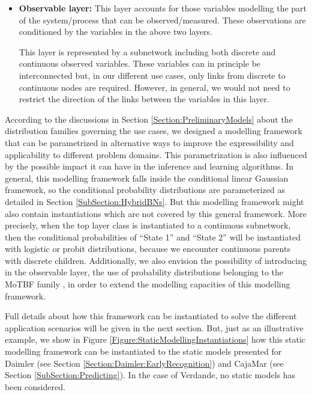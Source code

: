 \begin{itemize}
\item \textbf{Observable layer:} This layer accounts for those variables modelling the part of the system/process that can be observed/measured. These observations are conditioned by the variables in the above two layers. 

This layer is represented by a subnetwork including both discrete and continuous observed variables. These variables can in principle be interconnected but, in our different use cases, only links from discrete to continuous nodes are required. However, in general, we would not need to restrict the direction of the links between the variables in this layer.

\end{itemize} 


According to the discussions in Section \ref{Section:PreliminaryModels} about the distribution families governing the use cases, we designed a modelling framework that can be parametrized in alternative ways to improve the expressibility and applicability to different problem domains. This parametrization is also influenced by the possible impact it can have in the inference and learning algorithms. In general, this modelling framework falls inside the conditional linear Gaussian framework, so the conditional probability distributions are parameterized as detailed in Section \ref{SubSection:HybridBNs}. But this modelling framework might also contain instantiations which are not covered by this general framework. More precisely, when the top layer class is instantiated to  a continuous subnetwork, then the conditional probabilities of ``State 1'' and ``State 2'' will be instantiated with logistic or probit distributions, because we encounter continuous parents with discrete children. Additionally, we also envision the possibility of introducing in the observable layer, the use of probability distributions belonging to the MoTBF family \cite{Langseth12}, in order to extend the modelling capacities of this modelling framework.

Full details about how this framework can be instantiated to solve the different application scenarios will be given in the next section. But, just as an illustrative example, we show in Figure \ref{Figure:StaticModellingInstantiations} how this static modelling framework can be instantiated to the static models presented for Daimler (see Section \ref{Section:Daimler:EarlyRecognition}) and CajaMar (see Section \ref{SubSection:Predicting}). In the case of Verdande, no static models has been considered. 


